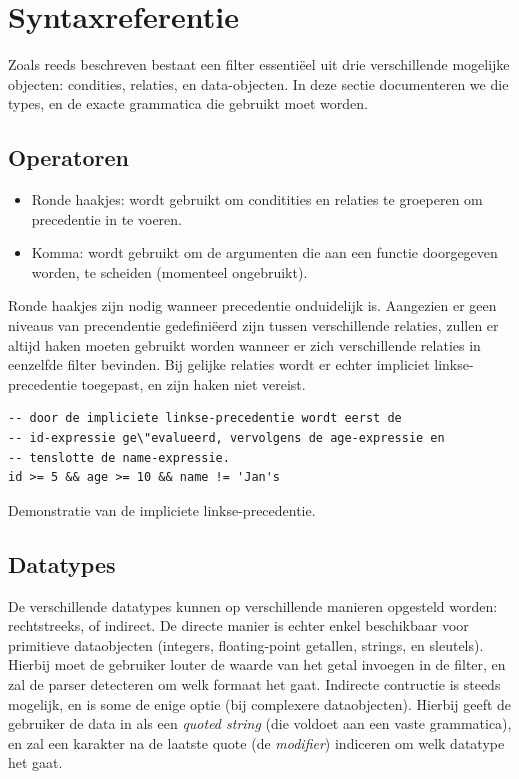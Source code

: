 \section{Syntaxreferentie}

Zoals reeds beschreven bestaat een filter essenti\"eel uit drie verschillende mogelijke objecten: condities, relaties, en data-objecten. In deze sectie documenteren we die types, en de exacte grammatica die gebruikt moet worden.

\subsection{Operatoren}

\begin{itemize}
\item{Ronde haakjes: wordt gebruikt om conditities en relaties te groeperen om precedentie in te voeren.}
\item{Komma: wordt gebruikt om de argumenten die aan een functie doorgegeven worden, te scheiden (momenteel ongebruikt).}
\end{itemize}

Ronde haakjes zijn nodig wanneer precedentie onduidelijk is. Aangezien er geen niveaus van precendentie gedefini\"eerd zijn tussen verschillende relaties, zullen er altijd haken moeten gebruikt worden wanneer er zich verschillende relaties in eenzelfde filter bevinden. Bij gelijke relaties wordt er echter impliciet linkse-precedentie toegepast, en zijn haken niet vereist.

\begin{code}
\begin{verbatim}
-- door de impliciete linkse-precedentie wordt eerst de
-- id-expressie ge\"evalueerd, vervolgens de age-expressie en
-- tenslotte de name-expressie.
id >= 5 && age >= 10 && name != 'Jan's

\end{verbatim}
\caption{Demonstratie van de impliciete linkse-precedentie.}
\end{code}

\subsection{Datatypes}

De verschillende datatypes kunnen op verschillende manieren opgesteld worden: rechtstreeks, of indirect. De directe manier is echter enkel beschikbaar voor primitieve dataobjecten (integers, floating-point getallen, strings, en sleutels). Hierbij moet de gebruiker louter de waarde van het getal invoegen in de filter, en zal de parser detecteren om welk formaat het gaat.
Indirecte contructie is steeds mogelijk, en is some de enige optie (bij complexere dataobjecten). Hierbij geeft de gebruiker de data in als een \emph{quoted string} (die voldoet aan een vaste grammatica), en zal een karakter na de laatste quote (de \emph{modifier}) indiceren om welk datatype het gaat.

